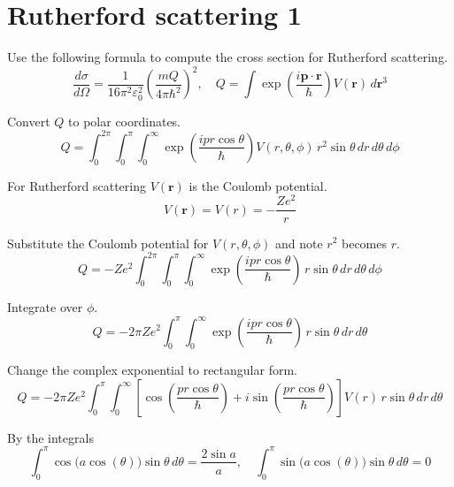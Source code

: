 


\section*{Rutherford scattering 1}

Use the following formula to compute the cross section for Rutherford scattering.
\begin{equation*}
\frac{d\sigma}{d\Omega}=\frac{1}{16\pi^2\varepsilon_0^2}\left(\frac{mQ}{4\pi\hbar^2}\right)^2,\quad
Q=\int\exp\left(\frac{i\mathbf p\cdot\mathbf r}{\hbar}\right)V(\mathbf r)\,d\mathbf r^3
\end{equation*}

Convert $Q$ to polar coordinates.
\begin{equation*}
Q=\int_0^{2\pi}
\int_0^\pi
\int_0^\infty
\exp\left(\frac{ipr\cos\theta}{\hbar}\right)V(r,\theta,\phi)
\,r^2\sin\theta\,dr\,d\theta\,d\phi
\end{equation*}

For Rutherford scattering $V(\mathbf r)$ is the Coulomb potential.
\begin{equation*}
V(\mathbf r)=V(r)=-\frac{Ze^2}{r}
\end{equation*}

Substitute the Coulomb potential for $V(r,\theta,\phi)$ and note $r^2$ becomes $r$.
\begin{equation*}
Q=-Ze^2
\int_0^{2\pi}
\int_0^\pi
\int_0^\infty
\exp\left(\frac{ipr\cos\theta}{\hbar}\right)
\,r\sin\theta\,dr\,d\theta\,d\phi
\end{equation*}

Integrate over $\phi$.
\begin{equation*}
Q=-2\pi Ze^2
\int_0^\pi
\int_0^\infty
\exp\left(\frac{ipr\cos\theta}{\hbar}\right)
\,r\sin\theta\,dr\,d\theta
\end{equation*}

Change the complex exponential to rectangular form.
\begin{equation*}
Q=-2\pi Ze^2
\int_0^\pi
\int_0^\infty
\left[
\cos\left(\frac{pr\cos\theta}{\hbar}\right)
+i\sin\left(\frac{pr\cos\theta}{\hbar}\right)
\right]
V(r)\,r\sin\theta\,dr\,d\theta
\end{equation*}

By the integrals
\begin{equation*}
\int_0^\pi\cos\bigl(a\cos(\theta)\bigr)\sin\theta\,d\theta=\frac{2\sin a}{a},\quad
\int_0^\pi\sin\bigl(a\cos(\theta)\bigr)\sin\theta\,d\theta=0
\end{equation*}

